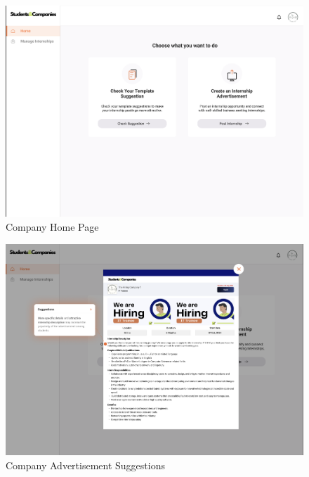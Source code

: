 \documentclass{article}
\begin{document}
\begin{figure}[H]
    \centering
    \includegraphics[scale = 0.42]{figures/UserInterfaces/Company/CompanyHome.png}
    \caption{Company Home Page}
     \centering
\end{figure}
\begin{figure}[H]
    \centering
    \includegraphics[scale = 0.42]{figures/UserInterfaces/Company/AddSuggestions.png}
    \caption{Company Advertisement Suggestions}
     \centering
\end{figure}
\end{document}
